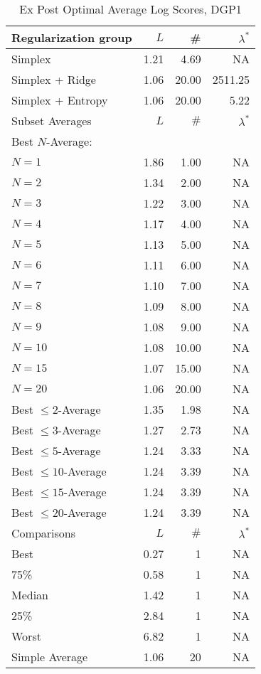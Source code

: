 \begin{table}[htp] 
\begin{center} 
\caption{Ex Post Optimal Average Log Scores, DGP1} 
\begin{tabular}{lrrr} 
\toprule 
\toprule 
Regularization group & $ L $ & \# & $\lambda^*$ \\ 
\midrule 
Simplex & 1.21 & 4.69 & NA \\ 
Simplex + Ridge & 1.06 & 20.00 & 2511.25 \\ 
Simplex + Entropy & 1.06 & 20.00 & 5.22 \\ 
\midrule 
\midrule 
Subset Averages & $ L $ & $\#$ & $\lambda^*$ \\ 
\midrule 
Best $N$-Average: &  &  & \\ 
\quad $N = 1$ & 1.86 & 1.00 & NA \\ 
\quad $N = 2$ & 1.34 & 2.00 & NA \\ 
\quad $N = 3$ & 1.22 & 3.00 & NA \\ 
\quad $N = 4$ & 1.17 & 4.00 & NA \\ 
\quad $N = 5$ & 1.13 & 5.00 & NA \\ 
\quad $N = 6$ & 1.11 & 6.00 & NA \\ 
\quad $N = 7$ & 1.10 & 7.00 & NA \\ 
\quad $N = 8$ & 1.09 & 8.00 & NA \\ 
\quad $N = 9$ & 1.08 & 9.00 & NA \\ 
\quad $N = 10$ & 1.08 & 10.00 & NA \\ 
\quad $N = 15$ & 1.07 & 15.00 & NA \\ 
\quad $N = 20$ & 1.06 & 20.00 & NA \\ 
Best $\leq 2$-Average & 1.35 & 1.98 & NA \\ 
Best $\leq 3$-Average & 1.27 & 2.73 & NA \\ 
Best $\leq 5$-Average & 1.24 & 3.33 & NA \\ 
Best $\leq 10$-Average & 1.24 & 3.39 & NA \\ 
Best $\leq 15$-Average & 1.24 & 3.39 & NA \\ 
Best $\leq 20$-Average & 1.24 & 3.39 & NA \\ 
\midrule 
\midrule 
Comparisons & $ L $ & $\#$ & $\lambda^*$ \\ 
\midrule 
Best & 0.27 & 1 & NA \\ 
75\% & 0.58 & 1 & NA \\ 
Median & 1.42 & 1 & NA \\ 
25\% & 2.84 & 1 & NA \\ 
Worst & 6.82 & 1 & NA \\ 
\midrule 
Simple Average & 1.06 & 20 & NA \\ 
\bottomrule 
\bottomrule 
\end{tabular} 
\end{center} 
\end{table} 
